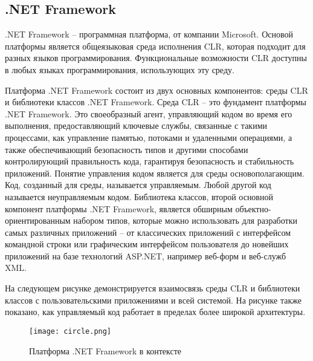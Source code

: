 \subsection{.NET Framework}


.NET Framework – программная платформа, от компании Microsoft. Основой платформы является общеязыковая среда исполнения CLR, которая подходит для разных языков программирования. Функциональные возможности CLR доступны в любых языках программирования, использующих эту среду.

Платформа  .NET Framework состоит из двух основных компонентов: среды CLR и библиотеки классов .NET Framework. Среда CLR – это фундамент платформы .NET Framework. Это своеобразный агент, управляющий кодом во время его выполнения, предоставляющий ключевые службы, связанные с такими процессами, как управление памятью, потоками и удаленными операциями, а также обеспечивающий безопасность типов и другими способами контролирующий правильность кода, гарантируя безопасность и стабильность приложений. Понятие управления кодом является для среды основополагающим. Код, созданный для среды, называется управляемым. Любой другой код называется неуправляемым кодом. Библиотека классов, второй основной компонент платформы .NET Framework, является обширным объектно-ориентированным набором типов, которые можно использовать для разработки самых различных приложений – от классических приложений с интерфейсом командной строки или графическим интерфейсом пользователя до новейших приложений на базе технологий ASP.NET, например веб-форм и веб-служб XML.

На следующем рисунке демонстрируется взаимосвязь среды CLR и библиотеки классов с пользовательскими приложениями и всей системой. На рисунке также показано, как управляемый код работает в пределах более широкой архитектуры.

\begin{figure}[h!]
	\centering
	\texttt{[image: circle.png]}
	\caption{Платформа .NET Framework в контексте}
\end{figure}
